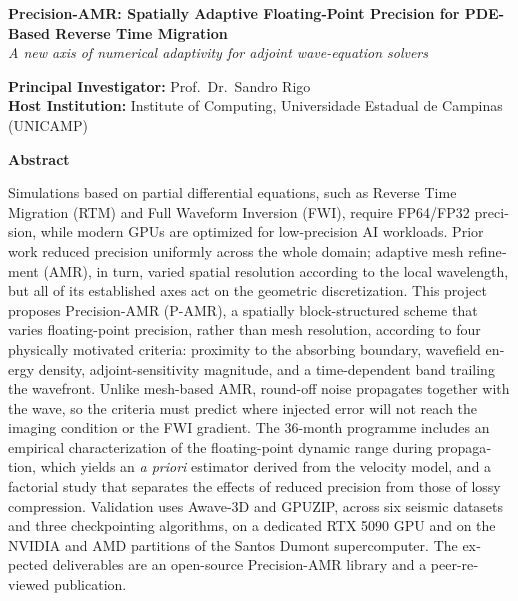 \documentclass[12pt,a4paper]{article}
\newcommand{\pamr}{P\nobreakdash-AMR}
\begin{document}
\newpage

\thispagestyle{empty}
\begin{otherlanguage}{english}

\begin{center}
{\large\bfseries Precision-AMR: Spatially Adaptive Floating-Point Precision
for PDE-Based Reverse Time Migration}\\[0.6em]
{\itshape A new axis of numerical adaptivity for adjoint wave-equation
solvers}
\end{center}

\vspace{1.5em}

\begin{flushleft}
\textbf{Principal Investigator:} Prof.\ Dr.\ Sandro Rigo\\
\textbf{Host Institution:} Institute of Computing, Universidade Estadual de
Campinas (UNICAMP)
\end{flushleft}

\vspace{1.5em}

\noindent\textbf{Abstract}

\vspace{0.5em}

Simulations based on partial differential equations, such as Reverse Time
Migration (RTM) and Full Waveform Inversion (FWI), require FP64/FP32
precision, while modern GPUs are optimized for low-precision AI workloads.
Prior work reduced precision uniformly across the whole domain; adaptive
mesh refinement (AMR), in turn, varied spatial resolution according to the
local wavelength, but all of its established axes act on the geometric
discretization. This project proposes Precision-AMR (\pamr{}), a spatially
block-structured scheme that varies floating-point precision, rather than
mesh resolution, according to four physically motivated criteria: proximity
to the absorbing boundary, wavefield energy density, adjoint-sensitivity
magnitude, and a time-dependent band trailing the wavefront. Unlike
mesh-based AMR, round-off noise propagates together with the wave, so the
criteria must predict where injected error will not reach the imaging
condition or the FWI gradient. The 36-month programme includes an empirical
characterization of the floating-point dynamic range during propagation,
which yields an \emph{a priori} estimator derived from the velocity model,
and a factorial study that separates the effects of reduced precision from
those of lossy compression. Validation uses Awave-3D and GPUZIP, across six
seismic datasets and three checkpointing algorithms, on a dedicated RTX 5090
GPU and on the NVIDIA and AMD partitions of the Santos Dumont
supercomputer. The expected deliverables are an open-source Precision-AMR
library and a peer-reviewed publication.

\end{otherlanguage}
\end{document}
